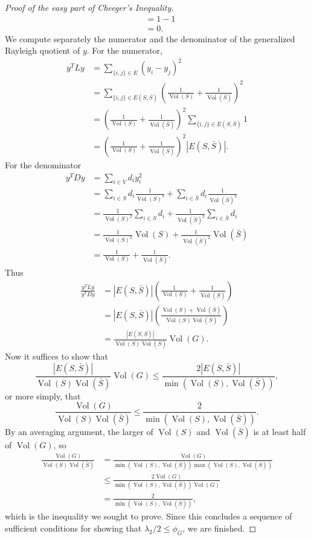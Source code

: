 \documentclass[11pt]{article}
\newcommand{\1}{\mathbf{1}}
\newcommand{\0}{\mathbf{0}}
\DeclareMathOperator*{\Vol}{Vol}
\begin{document}
\begin{proof}[Proof of the easy part of Cheeger's Inequality]
\begin{align*}
    & = 1 - 1 \\
    & = 0.
  \end{align*}
  We compute separately the numerator and the denominator of the generalized Rayleigh quotient of $y$.
  For the numerator,
  \begin{align*}
    y^T L y & = \sum_{\{i, j\} \in E} (y_i - y_j)^2 \\
    & = \sum_{\{i, j\} \in E(S, \bar{S})} \left(\frac{1}{\Vol(S)} + \frac{1}{\Vol(\bar{S})}\right)^2 \\
    & = \left(\frac{1}{\Vol(S)} + \frac{1}{\Vol(\bar{S})}\right)^2 \sum_{\{i, j\} \in E(S, \bar{S})} 1 \\
    & = \left(\frac{1}{\Vol(S)} + \frac{1}{\Vol(\bar{S})}\right)^2 |E(S, \bar{S})|.
  \end{align*}
  For the denominator
  \begin{align*}
    y^T D y & = \sum_{i \in V} d_i y_i^2 \\
    & = \sum_{i \in S} d_i \frac{1}{\Vol(S)^2} + \sum_{i \in \bar{S}} d_i \frac{1}{\Vol(\bar{S})^2} \\
    & = \frac{1}{\Vol(S)^2} \sum_{i \in S} d_i + \frac{1}{\Vol(\bar{S})^2} \sum_{i \in \bar{S}} d_i \\
    & = \frac{1}{\Vol(S)^2} \Vol(S) + \frac{1}{\Vol(\bar{S})^2} \Vol(\bar{S}) \\
    & = \frac{1}{\Vol(S)} + \frac{1}{\Vol(\bar{S})}.
  \end{align*}
  Thus
  \begin{align*}
    \frac{y^T L y}{y^T D y} & = |E(S, \bar{S})| \left(\frac{1}{\Vol(S)} + \frac{1}{\Vol(\bar{S})}\right) \\
    & = |E(S, \bar{S})| \left(\frac{\Vol(S) + \Vol(\bar{S})}{\Vol(S) \Vol(\bar{S})}\right) \\
    & = \frac{|E(S, \bar{S})|}{\Vol(S) \Vol(\bar{S})} \Vol(G).
  \end{align*}
  Now it suffices to show that
  \begin{equation*}
    \frac{|E(S, \bar{S})|}{\Vol(S) \Vol(\bar{S})} \Vol(G) \leq \frac{2 |E(S, \bar{S})|}{\min(\Vol(S), \Vol(\bar{S}))},
  \end{equation*}
  or more simply, that
  \begin{equation*}
    \frac{\Vol(G)}{\Vol(S) \Vol(\bar{S})} \leq \frac{2}{\min(\Vol(S), \Vol(\bar{S}))}.
  \end{equation*}
  By an averaging argument, the larger of $\Vol(S)$ and $\Vol(\bar{S})$ is at least half of $\Vol(G)$, so
  \begin{align*}
    \frac{\Vol(G)}{\Vol(S) \Vol(\bar{S})} & = \frac{\Vol(G)}{\min(\Vol(S), \Vol(\bar{S})) \max(\Vol(S), \Vol(\bar{S}))} \\
    & \leq \frac{2 \Vol(G)}{\min(\Vol(S), \Vol(\bar{S})) \Vol(G)} \\
    & = \frac{2}{\min(\Vol(S), \Vol(\bar{S}))},
  \end{align*}
  which is the inequality we sought to prove.
  Since this concludes a sequence of sufficient conditions for showing that $\lambda_2 / 2 \leq \phi_G$, we are finished.
\end{proof}
\end{document}

